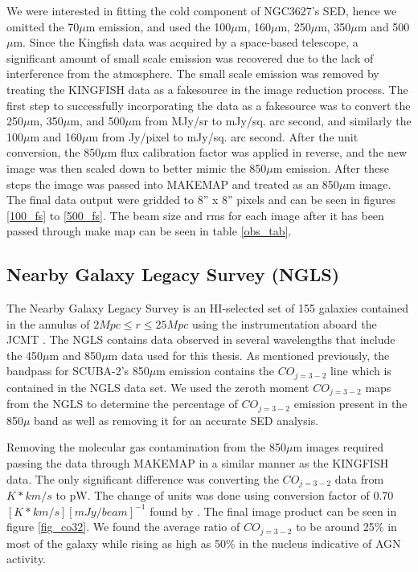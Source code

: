 We were interested in fitting the cold component of NGC3627's SED, hence we omitted the 70$\mu$m emission, and used the 100$\mu$m, 160$\mu$m, 250$\mu$m, 350$\mu$m and 500$\mu$m.  Since the Kingfish data was acquired by a space-based telescope, a significant amount of small scale emission was recovered due to the lack of interference from the atmosphere.  The small scale emission was removed by treating the KINGFISH data as a fakesource in the image reduction process.  The first step to successfully incorporating the data as a fakesource was to convert the 250$\mu$m, 350$\mu$m, and 500$\mu$m from MJy/sr to mJy/sq. arc second, and similarly the 100$\mu$m and 160$\mu$m from Jy/pixel to mJy/sq. arc second.   After the unit conversion, the 850$\mu$m flux calibration factor was applied in reverse, and the new image was then scaled down to better mimic the 850$\mu$m emission.  After these steps the image was passed into MAKEMAP and treated as an 850$\mu$m image.  The final data output were gridded to 8'' x 8'' pixels and can be seen in figures \ref{100_fs} to \ref{500_fs}.  The beam size and rms for each image after it has been passed through make map can be seen in table \ref{obs_tab}.

\subsection{Nearby Galaxy Legacy Survey (NGLS)}

The Nearby Galaxy Legacy Survey is an HI-selected set of 155 galaxies contained in the annulus of $2Mpc\leq r \leq25Mpc$ using the instrumentation aboard the JCMT \citet{wilson2012}.  The NGLS contains data observed in several wavelengths that include the 450$\mu$m and 850$\mu$m data used for this thesis.  As mentioned previously, the bandpass for SCUBA-2's 850$\mu$m emission contains the $CO_{j=3-2}$ line which is contained in the NGLS data set.  We used the zeroth moment $CO_{j=3-2}$ maps from the NGLS to determine the percentage of $CO_{j=3-2}$ emission present in the 850$\mu$ band as well as removing it for an accurate SED analysis.  

Removing the molecular gas contamination from the 850$\mu$m images required passing the data through MAKEMAP in a similar manner as the KINGFISH data.  The only significant difference was converting the $CO_{j=3-2}$ data from $K*km/s$ to pW.  The change of units was done using conversion factor of 0.70 $[K*km/s][mJy/beam]^{-1}$ found by \citet{drabek2012}.  The final image product can be seen in figure \ref{fig_co32}.  We found the average ratio of $CO_{j=3-2}$ to be around 25\% in most of the galaxy while rising as high as 50\% in the nucleus indicative of AGN activity.

